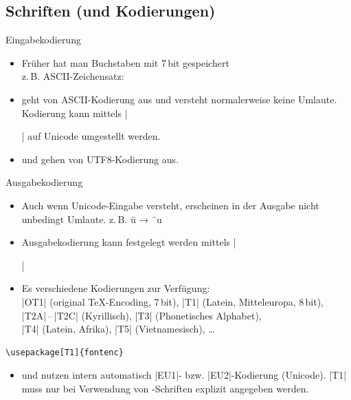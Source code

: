 \documentclass[
	vorläufig=true,
	datum=2016-10-28,
	titel={Allgemeine Formatierung und Pakete},
	web=false,
]{../tex/latexkurs-slides}
\begin{document}
\subsection{Schriften (und Kodierungen)}
\begin{frame}[fragile]{Eingabekodierung}
\begin{itemize}
\item Früher\texttrademark{} hat man Buchstaben mit 7\,bit gespeichert\\
z.\,B. ASCII-Zeichensatz:
\begin{verbatim*}
 !"#$%
@ABCDEFGHIJKLMNOPQRSTUVWXYZ[\]^_
`abcdefghijklmnopqrstuvwxyz{|}~ 
\end{verbatim*}
\item<2->  geht von ASCII-Kodierung aus und versteht normalerweise keine Umlaute.\\
Kodierung kann mittels |\usepackage[utf8]{inputenc}| auf Unicode umgestellt werden.
\item<3-> \XeLaTeX und  gehen von UTF8-Kodierung aus.
\end{itemize}
\end{frame}

\begin{frame}[fragile]{Ausgabekodierung}
\begin{itemize}
\item Auch wenn  Unicode-Eingabe versteht, erscheinen in der Ausgabe nicht unbedingt Umlaute. \hfill z.\,B. ü → ¨u
\item Ausgabekodierung kann festgelegt werden mittels |\usepackage[||]{fontenc}|
\item Es verschiedene Kodierungen zur Verfügung:
\\|OT1| (original \TeX-Encoding, 7\,bit), |T1| (Latein, Mitteleuropa, 8\,bit), |T2A|\,–\,|T2C| (Kyrillisch), |T3| (Phonetisches Alphabet),\\|T4| (Latein, Afrika), |T5| (Vietnamesisch), …
\end{itemize}
\begin{lstlisting}
\usepackage[T1]{fontenc}
\end{lstlisting}
\pause
\begin{itemize}
\item \XeLaTeX und  nutzen intern automatisch |EU1|- bzw. |EU2|-Kodierung (Unicode). |T1| muss  nur bei Verwendung von -Schriften explizit angegeben werden.
\end{itemize}
\end{frame}
\end{document}
